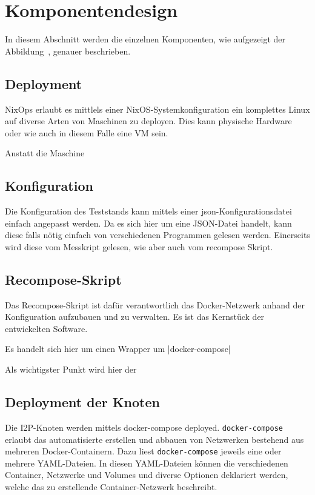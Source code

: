 \section{Komponentendesign}\label{sec:komponentendesign}

In diesem Abschnitt werden die einzelnen Komponenten, wie aufgezeigt der Abbildung~, genauer beschrieben.

\subsection{Deployment}

NixOps erlaubt es mittlels einer NixOS-Systemkonfiguration ein komplettes Linux auf diverse Arten von Maschinen zu deployen. Dies kann physische Hardware oder wie auch in diesem Falle eine VM sein.

Anstatt die Maschine

\subsection{Konfiguration}

Die Konfiguration des Teststands kann mittels einer json-Konfigurationsdatei einfach angepasst werden.
Da es sich hier um eine JSON-Datei handelt, kann diese falls nötig einfach von verschiedenen Programmen gelesen werden.
Einerseits wird diese vom Messkript gelesen, wie aber auch vom recompose Skript.


\subsection{Recompose-Skript}

Das Recompose-Skript ist dafür verantwortlich das Docker-Netzwerk anhand der Konfiguration aufzubauen und zu verwalten.
Es ist das Kernstück der entwickelten Software.

Es handelt sich hier um einen Wrapper um \lstinlline|docker-compose|

Als wichtigster Punkt wird hier der 

\subsection{Deployment der Knoten}

Die I2P-Knoten werden mittels docker-compose deployed.
\lstinline|docker-compose| erlaubt das automatisierte erstellen und abbauen von Netzwerken bestehend aus mehreren Docker-Containern.
Dazu liest \lstinline|docker-compose| jeweils eine oder mehrere YAML-Dateien.
In diesen YAML-Dateien können die verschiedenen Container, Netzwerke und Volumes und diverse Optionen deklariert werden, welche das zu erstellende Container-Netzwerk beschreibt.

